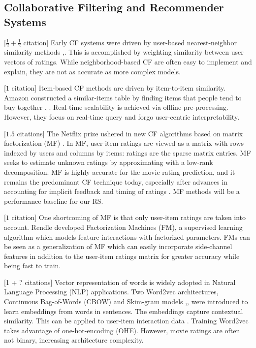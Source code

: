 \subsection{Collaborative Filtering and Recommender Systems}

[$ \frac{1}{2} + \frac{1}{2} $ citation] Early CF systems were driven by user-based nearest-neighbor similarity methods \cite{herlocker1999algorithmic},\cite{smith2017two}. This is accomplished by weighting similarity between user vectors of ratings. While neighborhood-based CF are often easy to implement and explain, they are not as accurate as more complex models.

[$1$ citation] Item-based CF methods are driven by item-to-item similarity. Amazon constructed a similar-items table by finding items that people tend to buy together \cite{linden2003amazon}, \cite{smith2017two}. Real-time scalability is achieved via offline pre-processing. However, they focus on real-time query and forgo user-centric interpretability. 

[$1.5$ citations] The Netflix prize ushered in new CF algorithms based on matrix factorization (MF) \cite{funk2006netflix}. In MF, user-item ratings are viewed as a matrix with rows indexed by users and columns by items: ratings are the sparse matrix entries. MF seeks to estimate unknown ratings by approximating with a low-rank decomposition. MF is highly accurate for the movie rating prediction, and it remains the predominant CF technique today, especially after advances in accounting for implicit feedback and timing of ratings \cite{koren2008factorization}. MF methods will be a performance baseline for our RS.

[$1$ citation] One shortcoming of MF is that only user-item ratings are taken into account. Rendle \cite{rendle2012factorization} developed Factorization Machines (FM), a supervised learning algorithm which models feature interactions with factorized parameters.  FMs can be seen as a generalization of MF which can easily incorporate side-channel features in addition to the user-item ratings matrix for greater accuracy while being fast to train.

[1 + ? citations] Vector representation of words is widely adopted in Natural Language Processing (NLP) applications. Two Word2vec architectures, Continuous Bag-of-Words (CBOW) and Skim-gram models \cite{mikolov2013efficient},\cite{mikolov2013distributed}, \cite{rong2014word2vec} were introduced to learn embeddings from words in sentences. The embeddings capture contextual similarity. This can be applied to user-item interaction data \cite{ozsoy2016word}. Training Word2vec takes advantage of one-hot-encoding (OHE). However, movie ratings are often not binary, increasing architecture complexity.

